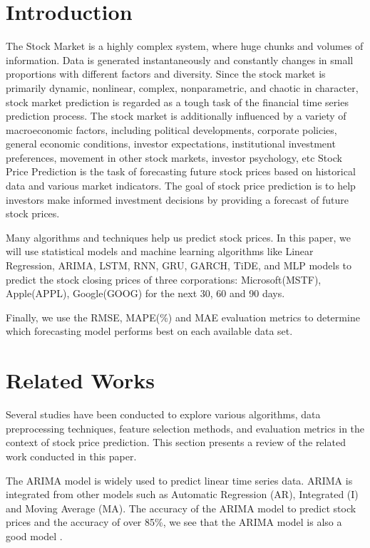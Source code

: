 \documentclass{ieeeojies}
\begin{document}
\section{Introduction}
\label{sec:introduction}
The Stock Market is a highly complex system, where huge chunks and volumes of information. Data is generated instantaneously and constantly changes in small proportions with different factors and diversity. Since the stock market is primarily dynamic, nonlinear, complex, nonparametric, and chaotic in character, stock market prediction is regarded as a tough task of the financial time series prediction process. The stock market is additionally influenced by a variety of macroeconomic factors, including political developments, corporate policies, general economic conditions, investor expectations, institutional investment preferences, movement in other stock markets, investor psychology, etc
Stock Price Prediction is the task of forecasting future stock prices based on historical data and various market indicators. The goal of stock price prediction is to help investors make informed investment decisions by providing a forecast of future stock prices. 

Many algorithms and techniques help us predict stock prices. In this paper, we will use statistical models and machine learning algorithms like  Linear Regression, ARIMA, LSTM, RNN, GRU, GARCH, TiDE, and MLP models to predict the stock closing prices of three corporations: Microsoft(MSTF), Apple(APPL), Google(GOOG) for the next 30, 60 and 90 days.

Finally, we use the RMSE, MAPE({\%}) and MAE evaluation metrics to determine which forecasting model performs best on each available data set.


\section{Related Works}
Several studies have been conducted to explore various algorithms, data preprocessing techniques, feature selection methods, and evaluation metrics in the context of stock price prediction. This section presents a review of the related work conducted in this paper.

The ARIMA model is widely used to predict linear time series data. ARIMA is integrated from other models such as Automatic Regression (AR), Integrated (I) and Moving Average (MA). The accuracy of the ARIMA model to predict stock prices and the accuracy of over 85\%, we see that the ARIMA model is also a good model \cite{b1}.
\end{document}
